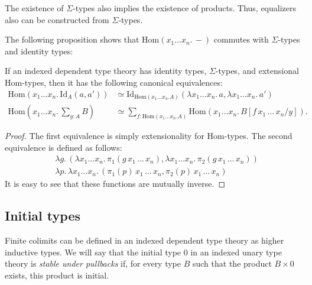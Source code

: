 \documentclass[reqno]{mscs}
\newcommand{\fs}[1]{\mathrm{#1}}
\newcommand{\Hom}{\fs{Hom}}
\newcommand{\Id}{\fs{Id}}
\numberwithin{figure}{section}
\begin{document}
\begin{remark}
The existence of $\Sigma$-types also implies the existence of products.
Thus, equalizers also can be constructed from $\Sigma$-types.
\end{remark}

The following proposition shows that $\Hom(x_1 \ldots x_n.\,-)$ commutes with $\Sigma$-types and identity types:
\begin{prop}
If an indexed dependent type theory has identity types, $\Sigma$-types, and extensional $\Hom$-types, then it has the following canonical equivalences:
\begin{align*}
\Hom(x_1 \ldots x_n.\,\Id_A(a,a')) & \simeq \Id_{\Hom(x_1 \ldots x_n. A)}(\lambda x_1 \ldots x_n.\,a, \lambda x_1 \ldots x_n.\,a') \\
\Hom(x_1 \ldots x_n.\,\sum_{y : A} B) & \simeq \sum_{f : \Hom(x_1 \ldots x_n. A)} \Hom(x_1 \ldots x_n.\,B[f\,x_1\,\ldots\,x_n / y]).
\end{align*}
\end{prop}
\begin{proof}
The first equivalence is simply extensionality for $\Hom$-types.
The second equivalence is defined as follows:
\begin{align*}
& \lambda g.\,(\lambda x_1 \ldots x_n.\,\pi_1(g\,x_1\,\ldots\,x_n), \lambda x_1 \ldots x_n.\,\pi_2(g\,x_1\,\ldots\,x_n)) \\
& \lambda p.\,\lambda x_1 \ldots x_n.\,(\pi_1(p)\,x_1\,\ldots\,x_n, \pi_2(p)\,x_1\,\ldots\,x_n)
\end{align*}
It is easy to see that these functions are mutually inverse.
\end{proof}

\subsection{Initial types}
\label{sec:dep-initial}

Finite colimits can be defined in an indexed dependent type theory as higher inductive types.
We will say that the initial type $0$ in an indexed unary type theory is \emph{stable under pullbacks} if, for every type $B$ such that the product $B \times 0$ exists, this product is initial.
\end{document}
